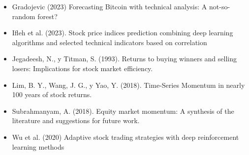\documentclass[a0,portrait]{a0poster}
\begin{document}
\begin{multicols}{2}
         \begin{itemize}
            \vspace{-,5 cm}
            \item Gradojevic (2023) Forecasting Bitcoin with technical analysis: A not-so-random forest?
            \vspace{-1 cm}
            \item Ifleh et al. (2023). Stock price indices prediction combining deep learning algorithms and selected technical 
            indicators based on correlation
            \vspace{-1 cm}
            \item Jegadeesh, N., y Titman, S. (1993). Returns to buying winners and selling losers: Implications for stock 
            market efficiency.
            \vspace{-1 cm}
            \item Lim, B. Y., Wang, J. G., y Yao, Y. (2018). Time-Series Momentum in nearly 100 years of stock returns.            
            \vspace{-1 cm}
            \item Subrahmanyam, A. (2018). Equity market momentum: A synthesis of the literature and suggestions for future work.
            \vspace{-1 cm}
            \item Wu et al. (2020) Adaptive stock trading strategies with deep reinforcement learning methods
        \end{itemize}
        
    
    
    

    
\end{multicols}
\end{document}
